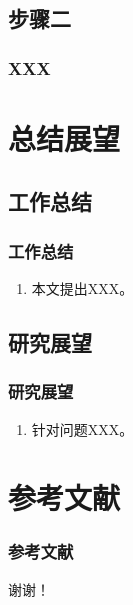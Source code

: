 \documentclass[AutoFakeBold,AutoFakeSlant，fontset=windows]{beamer}
\begin{document}
\subsection{步骤二}

\begin{frame}
  \frametitle{XXX}

\end{frame}

\section{总结展望}

\subsection{工作总结}
\begin{frame}
  \frametitle{工作总结}

  \begin{enumerate}
    \item 本文提出XXX。
  \end{enumerate}
\end{frame}

\subsection{研究展望}
\begin{frame}
  \frametitle{研究展望}

  \begin{enumerate}
    \item 针对问题XXX。
  \end{enumerate}
\end{frame}

\section{参考文献}
\begin{frame}
	\frametitle{参考文献}
	
\end{frame}



\begin{frame}[plain]
  
    \LARGE{
   谢谢！}
  
\end{frame}
\end{document}
